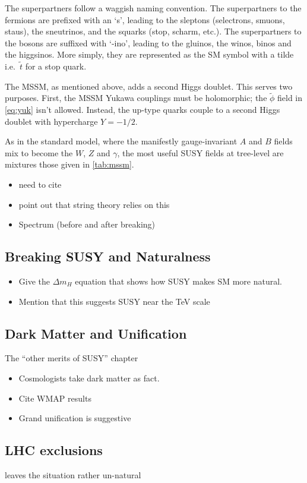The superpartners follow a waggish naming convention. The superpartners to the fermions are prefixed with an `s', leading to the sleptons (selectrons, smuons, staus), the sneutrinos, and the squarks (stop, scharm, etc.). The superpartners to the bosons are suffixed with `-ino', leading to the gluinos, the winos, binos and the higgsinos. More simply, they are represented as the SM symbol with a tilde i.e.~$\tilde{t}$ for a stop quark.

The MSSM, as mentioned above, adds a second Higgs doublet. This serves two purposes. First, the MSSM Yukawa couplings must be holomorphic; the $\tilde{\phi}$ field in \cref{eq:yuk} isn't allowed. Instead, the up-type quarks couple to a second Higgs doublet with hypercharge $Y = -1/2$.

As in the standard model, where the manifestly gauge-invariant $A$ and $B$ fields mix to become the $W$, $Z$ and $\gamma$, the most useful SUSY fields at tree-level are mixtures those given in \cref{tab:mssm}. %

\begin{itemize}
\item need to cite~\cite{light-squarks}
\item point out that string theory relies on this
\item Spectrum (before and after breaking)
\end{itemize}

\subsection{Breaking SUSY and Naturalness}
\begin{itemize}
\item Give the $\Delta m_{H}$ equation that shows how SUSY makes SM more natural.
\item Mention that this suggests SUSY near the TeV scale
\end{itemize}
\subsection{Dark Matter and Unification}
The ``other merits of SUSY'' chapter
\begin{itemize}
\item Cosmologists take dark matter as fact.
\item Cite WMAP results
\item Grand unification is suggestive
\end{itemize}
\subsection{LHC exclusions}
leaves the situation rather un-natural
